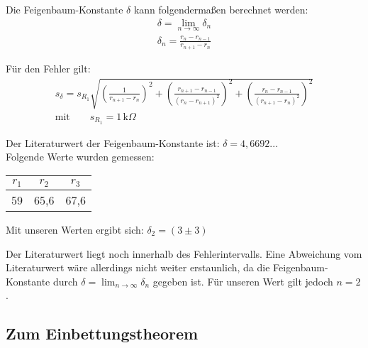Die Feigenbaum-Konstante \(\delta\) kann folgendermaßen berechnet werden: 
\begin{align}
    \delta = \lim_{n \to \infty} \delta_n \\
    \delta_n = \frac{r_n - r_{n-1}}{r_{n+1} -r_n}
\end{align}

Für den Fehler gilt: 
\begin{align}
    s_{\delta} = s_{R_1} \sqrt{(\frac{1}{r_{n+1}-r_n})^2 + (\frac{r_{n+1}-r_{n-1}}{(r_n - r_{n+1})^2})^2 + (\frac{r_n - r_{n-1}}{(r_{n+1}-r_n)^2})^2}\\
    \text{mit} \qquad s_{R_1} = 1 \, \text{k}\Omega
\end{align}

Der Literaturwert der Feigenbaum-Konstante ist: \(\delta = 4,6692...\)\\

Folgende Werte wurden gemessen: \\
\begin{tabular}{c c c}
    $r_1$ & $r_2$ & $r_3$\\
    \hline
    59 & 65,6 & 67,6
\end{tabular}

Mit unseren Werten ergibt sich: \(\delta_2 = (3 \pm 3)\)

Der Literaturwert liegt noch innerhalb des Fehlerintervalls. Eine Abweichung vom Literaturwert wäre allerdings nicht weiter erstaunlich, da die Feigenbaum-Konstante durch \( \delta = \lim_{n \to \infty} \delta_n\) gegeben ist. Für unseren Wert gilt jedoch \( n=2\).

\subsection{Zum Einbettungstheorem}

